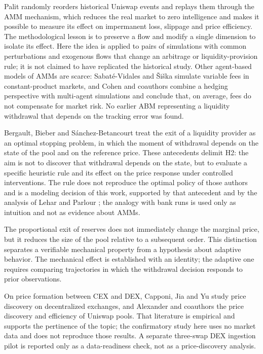 Palit \cite{palit2022shuffled} randomly reorders historical Uniswap events and replays them through the AMM mechanism, which reduces the real market to zero intelligence and makes it possible to measure its effect on impermanent loss, slippage and price efficiency. The methodological lesson is to preserve a flow and modify a single dimension to isolate its effect. Here the idea is applied to pairs of simulations with common perturbations and exogenous flows that change an arbitrage or liquidity-provision rule; it is not claimed to have replicated the historical study. Other agent-based models of AMMs are scarce: Sabaté-Vidales and Šiška \cite{sabatevidales2023variable} simulate variable fees in constant-product markets, and Cohen and coauthors \cite{cohen2023inefficiency} combine a hedging perspective with multi-agent simulations and conclude that, on average, fees do not compensate for market risk. No earlier ABM representing a liquidity withdrawal that depends on the tracking error was found.

Bergault, Bieber and Sánchez-Betancourt \cite{bergault2025exit} treat the exit of a liquidity provider as an optimal stopping problem, in which the moment of withdrawal depends on the state of the pool and on the reference price. These antecedents delimit H2: the aim is not to discover that withdrawal depends on the state, but to evaluate a specific heuristic rule and its effect on the price response under controlled interventions. The rule does not reproduce the optimal policy of those authors and is a modeling decision of this work, supported by that antecedent and by the analysis of Lehar and Parlour \cite{lehar2025uniswap}; the analogy with bank runs \cite{diamond1983bank} is used only as intuition and not as evidence about AMMs.

The proportional exit of reserves does not immediately change the marginal price, but it reduces the size of the pool relative to a subsequent order. This distinction separates a verifiable mechanical property from a hypothesis about adaptive behavior. The mechanical effect is established with an identity; the adaptive one requires comparing trajectories in which the withdrawal decision responds to prior observations.

On price formation between CEX and DEX, Capponi, Jia and Yu \cite{capponi2026price} study price discovery on decentralized exchanges, and Alexander and coauthors \cite{alexander2025price} the price discovery and efficiency of Uniswap pools. That literature is empirical and supports the pertinence of the topic; the confirmatory study here uses no market data and does not reproduce those results. A separate three-swap DEX ingestion pilot is reported only as a data-readiness check, not as a price-discovery analysis.

